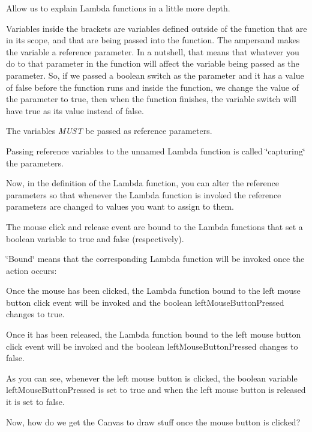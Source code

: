 Allow us to explain Lambda functions in a little more depth.

Variables inside the brackets are variables defined outside of the function that are in its scope, and that are being passed into the function. The ampersand makes the variable a reference parameter. In a nutshell, that means that whatever you do to that parameter in the function will affect the variable being passed as the parameter. So, if we passed a boolean {\ttfamily switch} as the parameter and it has a value of {\ttfamily false} before the function runs and inside the function, we change the value of the parameter to {\ttfamily true}, then when the function finishes, the variable {\ttfamily switch} will have {\ttfamily true} as its value instead of {\ttfamily false}.

The variables {\itshape M\+U\+ST} be passed as reference parameters.

Passing reference variables to the unnamed Lambda function is called \char`\"{}capturing\char`\"{} the parameters.

Now, in the definition of the Lambda function, you can alter the reference parameters so that whenever the Lambda function is invoked the reference parameters are changed to values you want to assign to them.

The mouse click and release event are bound to the Lambda functions that set a boolean variable to true and false (respectively).

\char`\"{}\+Bound\char`\"{} means that the corresponding Lambda function will be invoked once the action occurs\+:


\begin{DoxyItemize}
\item Once the mouse has been clicked, the Lambda function bound to the left mouse button click event will be invoked and the boolean {\ttfamily left\+Mouse\+Button\+Pressed} changes to true.
\item Once it has been released, the Lambda function bound to the left mouse button click event will be invoked and the boolean {\ttfamily left\+Mouse\+Button\+Pressed} changes to false.
\end{DoxyItemize}

As you can see, whenever the left mouse button is clicked, the boolean variable {\ttfamily left\+Mouse\+Button\+Pressed} is set to true and when the left mouse button is released it is set to false.

Now, how do we get the Canvas to draw stuff once the mouse button is clicked?

